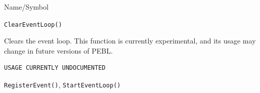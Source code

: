 \begin{desc}{Name/Symbol}
\item[Name/Symbol]  	\verb+ClearEventLoop()+ 

\item[Description]  Clears the event loop.  This function is currently experimental, and its usage may change in future versions of PEBL.

\item[Usage]       	
\begin{verbatim}
USAGE CURRENTLY UNDOCUMENTED
\end{verbatim}

\item[Example]	

\item[See Also] 
\verb+RegisterEvent()+, \verb+StartEventLoop()+
\end{desc}




